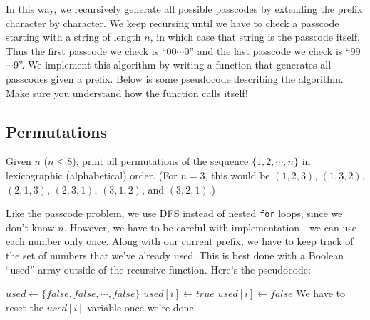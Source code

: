 In this way, we recursively generate all possible passcodes by extending the prefix character by character. We keep recursing until we have to check a passcode starting with a string of length $n$, in which case that string is the passcode itself. Thus the first passcode we check is ``00$\cdots$0'' and the last passcode we check is ``99$\cdots$9''. We implement this algorithm by writing a function that generates all passcodes given a prefix. Below is some pseudocode describing the algorithm. Make sure you understand how the function calls itself!

\noindent \begin{minipage}{\textwidth}
  \begin{algorithmic}[1]
      \State {}
      \State \Return
    \EndIf
      \State {}
    \EndFor
    \EndFunction
  \end{algorithmic}
\end{minipage}

\subsection{Permutations}

\begin{typewriter}
  Given $n$ ($n \le 8$), print all permutations of the sequence $\{1, 2, \cdots, n\}$ in lexicographic (alphabetical) order. (For $n=3$, this would be $(1, 2, 3)$, $(1, 3, 2)$, $(2, 1, 3)$, $(2, 3, 1)$, $(3, 1, 2)$, and $(3, 2, 1)$.)
\end{typewriter}

Like the passcode problem, we use DFS instead of nested \texttt{for} loops, since we don't know $n$. However, we have to be careful with implementation---we can use each number only once. Along with our current prefix, we have to keep track of the set of numbers that we've already used. This is best done with a Boolean ``used'' array outside of the recursive function. Here's the pseudocode:

\noindent \begin{minipage}{\textwidth}
  \begin{algorithmic}[1]
    \State $used \gets \{false, false, \cdots, false\}$
      \State {}
      \State \Return
    \EndIf
        \State $used[i] \gets true$
        \State {}
        \State $used[i] \gets false$
        \Comment We have to reset the $used[i]$ variable once we're done.
      \EndIf
    \EndFor
    \EndFunction
  \end{algorithmic}
\end{minipage}

